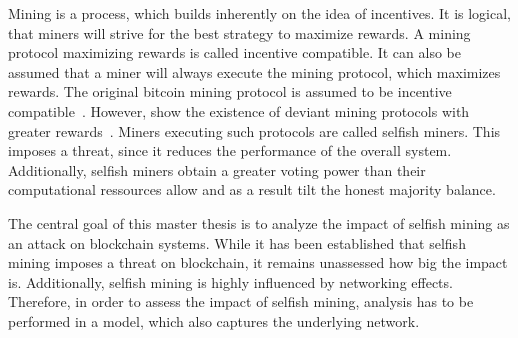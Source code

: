 Mining is a process, which builds inherently on the idea of incentives. It is logical, that miners will strive for the best strategy to maximize rewards. A mining protocol maximizing rewards is called incentive compatible. It can also be assumed that a miner will always execute the mining protocol, which maximizes rewards. The original bitcoin mining protocol is assumed to be incentive compatible~\cite{1}. However, \citeauthor{eyal} show the existence of deviant mining protocols with greater rewards~\cite{eyal}. Miners executing such protocols are called selfish miners. This imposes a threat, since it reduces the performance of the overall system. Additionally, selfish miners obtain a greater voting power than their computational ressources allow and as a result tilt the honest majority balance.

The central goal of this master thesis is to analyze the impact of selfish mining as an attack on blockchain systems. 
While it has been established that selfish mining imposes a threat on blockchain, it remains unassessed how big the impact is. 
Additionally, selfish mining is highly influenced by networking effects. 
Therefore, in order to assess the impact of selfish mining, analysis has to be performed in a model, which also captures the underlying network.





